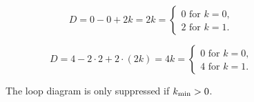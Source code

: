\documentclass[twoside,12pt]{article}
\begin{document}
\begin{figure}[t]
\begin{minipage}[t]{0.45\textwidth}
\begin{center}
$$D=0-0+2k=2k=\left\{
\begin{array}{l}
0\,\,\mbox{for}\,\,k=0,\\
2\,\,\mbox{for}\,\,k=1.
\end{array}\right.
$$
\end{center}
\end{minipage}
\hspace{0.1\textwidth}
\begin{minipage}[t]{0.3\textwidth}
\begin{center}
$$D=4-2\cdot 2+2\cdot (2k)=4k=\left\{
\begin{array}{l}
0\,\,\mbox{for}\,\,k=0,\\
4\,\,\mbox{for}\,\,k=1.
\end{array}\right.
$$
\end{center}
\end{minipage}
\caption{\label{3:2:5:minimalk:fig}
The loop diagram is only suppressed if $k_{\rm min} > 0$.}
\end{figure}
\end{document}
